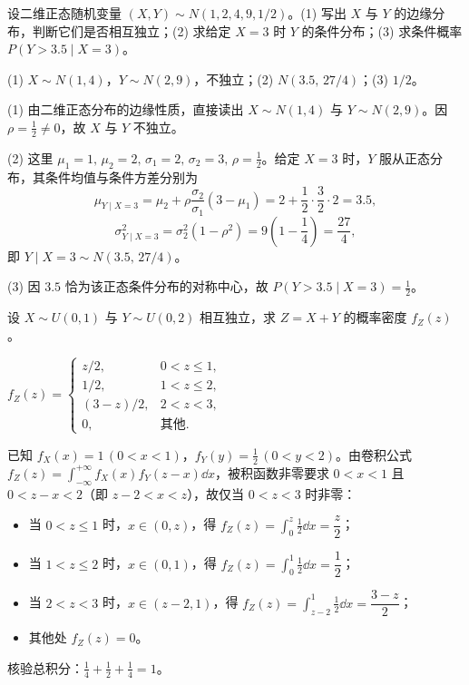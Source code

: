 \begin{exercise}
设二维正态随机变量 $(X,Y)\sim N(1,2,4,9,1/2)$。(1) 写出 $X$ 与 $Y$ 的边缘分布，判断它们是否相互独立；(2) 求给定 $X=3$ 时 $Y$ 的条件分布；(3) 求条件概率 $P(Y>3.5\mid X=3)$。
\begin{answer}
(1) $X\sim N(1,4)$，$Y\sim N(2,9)$，不独立；(2) $N(3.5,\,27/4)$；(3) $1/2$。
\end{answer}
\begin{solution}
(1) 由二维正态分布的边缘性质，直接读出 $X\sim N(1,4)$ 与 $Y\sim N(2,9)$。因 $\rho=\frac{1}{2}\ne 0$，故 $X$ 与 $Y$ 不独立。

(2) 这里 $\mu_1=1,\,\mu_2=2,\,\sigma_1=2,\,\sigma_2=3,\,\rho=\frac{1}{2}$。给定 $X=3$ 时，$Y$ 服从正态分布，其条件均值与条件方差分别为
\[
  \mu_{Y\mid X=3}=\mu_2+\rho\frac{\sigma_2}{\sigma_1}(3-\mu_1)=2+\frac{1}{2}\cdot\frac{3}{2}\cdot 2=3.5,
\]
\[
  \sigma_{Y\mid X=3}^2=\sigma_2^2(1-\rho^2)=9\left(1-\frac{1}{4}\right)=\frac{27}{4},
\]
即 $Y\mid X=3\sim N(3.5,\,27/4)$。

(3) 因 $3.5$ 恰为该正态条件分布的对称中心，故 $P(Y>3.5\mid X=3)=\frac{1}{2}$。
\end{solution}
\end{exercise}

\begin{exercise}
设 $X\sim U(0,1)$ 与 $Y\sim U(0,2)$ 相互独立，求 $Z=X+Y$ 的概率密度 $f_Z(z)$。
\begin{answer}
$f_Z(z)=\begin{cases} z/2,& 0<z\le 1,\\ 1/2,& 1<z\le 2,\\ (3-z)/2,& 2<z<3,\\ 0,& \text{其他}. \end{cases}$
\end{answer}
\begin{solution}
已知 $f_X(x)=1\,(0<x<1)$，$f_Y(y)=\frac{1}{2}\,(0<y<2)$。由卷积公式 $f_Z(z)=\int_{-\infty}^{+\infty}f_X(x)f_Y(z-x)\dd x$，被积函数非零要求 $0<x<1$ 且 $0<z-x<2$（即 $z-2<x<z$），故仅当 $0<z<3$ 时非零：
\begin{itemize}
  \item 当 $0<z\le 1$ 时，$x\in(0,z)$，得 $f_Z(z)=\int_{0}^{z}\frac{1}{2}\dd x=\dfrac{z}{2}$；
  \item 当 $1<z\le 2$ 时，$x\in(0,1)$，得 $f_Z(z)=\int_{0}^{1}\frac{1}{2}\dd x=\dfrac{1}{2}$；
  \item 当 $2<z<3$ 时，$x\in(z-2,1)$，得 $f_Z(z)=\int_{z-2}^{1}\frac{1}{2}\dd x=\dfrac{3-z}{2}$；
  \item 其他处 $f_Z(z)=0$。
\end{itemize}
核验总积分：$\frac{1}{4}+\frac{1}{2}+\frac{1}{4}=1$。
\end{solution}
\end{exercise}

